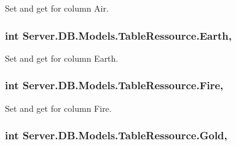 Set and get for column Air. 

\hypertarget{classServer_1_1DB_1_1Models_1_1TableRessource_a28f20f3d468730ffaa1fe87c34b5eb34}{
\subsubsection[{Earth}]{\setlength{\rightskip}{0pt plus 5cm}int Server.\-D\-B.\-Models.\-Table\-Ressource.\-Earth\hspace{0.3cm}{\ttfamily [get]}, {\ttfamily [set]}}}\label{classServer_1_1DB_1_1Models_1_1TableRessource_a28f20f3d468730ffaa1fe87c34b5eb34}


Set and get for column Earth. 

\hypertarget{classServer_1_1DB_1_1Models_1_1TableRessource_a2d29ff98fb11fa73de8d1ffcf7c5e689}{
\subsubsection[{Fire}]{\setlength{\rightskip}{0pt plus 5cm}int Server.\-D\-B.\-Models.\-Table\-Ressource.\-Fire\hspace{0.3cm}{\ttfamily [get]}, {\ttfamily [set]}}}\label{classServer_1_1DB_1_1Models_1_1TableRessource_a2d29ff98fb11fa73de8d1ffcf7c5e689}


Set and get for column Fire. 

\hypertarget{classServer_1_1DB_1_1Models_1_1TableRessource_af42f1f7c1df894cd54bc5965422c5310}{
\subsubsection[{Gold}]{\setlength{\rightskip}{0pt plus 5cm}int Server.\-D\-B.\-Models.\-Table\-Ressource.\-Gold\hspace{0.3cm}{\ttfamily [get]}, {\ttfamily [set]}}}\label{classServer_1_1DB_1_1Models_1_1TableRessource_af42f1f7c1df894cd54bc5965422c5310}


